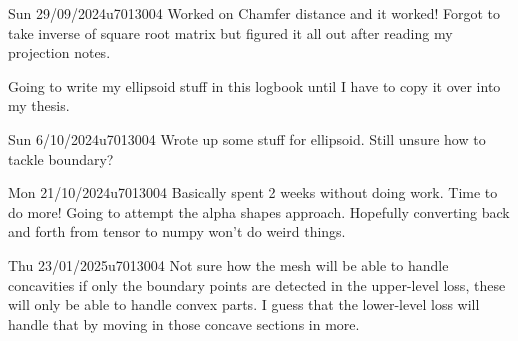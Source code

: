 \documentclass{project-logbook}
\begin{document}
	\begin{MeetingMinutes}{Sun 29/09/2024}{u7013004}
		Worked on Chamfer distance and it worked! Forgot to take inverse of square root matrix but figured it all out after reading my projection notes.

		Going to write my ellipsoid stuff in this logbook until I have to copy it over into my thesis.


	\end{MeetingMinutes}

	\begin{MeetingMinutes}{Sun 6/10/2024}{u7013004}
		Wrote up some stuff for ellipsoid. Still unsure how to tackle boundary?
	\end{MeetingMinutes}

	\begin{MeetingMinutes}{Mon 21/10/2024}{u7013004}
		Basically spent 2 weeks without doing work. Time to do more! Going to attempt the alpha shapes approach. Hopefully converting back and forth from tensor to numpy won't do weird things.
	\end{MeetingMinutes}

	\begin{MeetingMinutes}{Thu 23/01/2025}{u7013004}
		Not sure how the mesh will be able to handle concavities if only the boundary points are detected in the upper-level loss, these will only be able to handle convex parts. I guess that the lower-level loss will handle that by moving in those concave sections in more.
	\end{MeetingMinutes}
\end{document}
